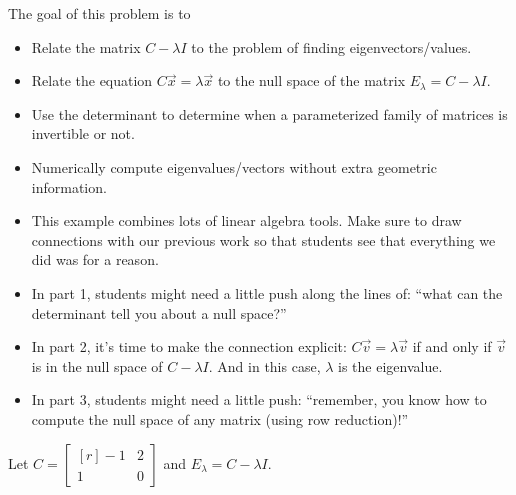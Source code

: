 \documentclass{problemset}
\newcommand{\mat}[1]{\begin{bmatrix*}[r]#1\end{bmatrix*}}
\begin{document}
	\vspace{-.2cm}
	\question
	\begin{annotation}
		\begin{goals}

			The goal of this problem is to
			\begin{itemize}
				\item Relate the matrix $C-\lambda I$ to the problem of finding eigenvectors/values.
				\item Relate the equation $C\vec x=\lambda \vec x$ to the null
					space of the matrix $E_{\lambda} = C-\lambda I$.
				\item Use the determinant to determine when a parameterized family of matrices
					is invertible or not.
				\item Numerically compute eigenvalues/vectors without extra geometric information.
			\end{itemize}
		\end{goals}

		\begin{notes}
			\begin{itemize}
				\item This example combines lots of linear algebra tools. Make sure to draw
					connections with our previous work so that students see that
					everything we did was for a reason.
				\item In part 1, students might need a little push along the lines of:
					``what can the determinant tell you about a null space?''
				\item In part 2, it's time to make the connection explicit: $C\vec v=\lambda \vec v$
					if and only if $\vec v$ is in the null space of $C-\lambda I$. And in this case,
					$\lambda$ is the eigenvalue.
				\item In part 3, students might need a little push: ``remember, you know how
					to compute the null space of any matrix (using row reduction)!''
			\end{itemize}
		\end{notes}
	\end{annotation}
	Let $C=\mat{-1&2\\1&0}$ and $E_\lambda = C-\lambda I$.
\end{document}
